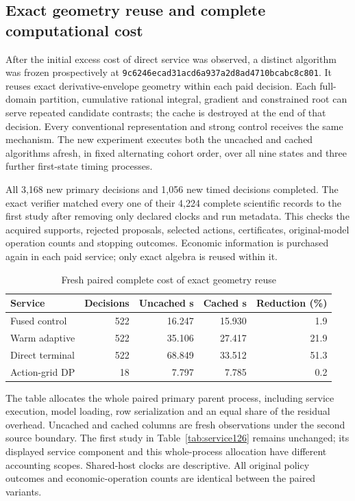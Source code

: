 \subsection{Exact geometry reuse and complete computational cost}\label{sec:cache_results126}
After the initial excess cost of direct service was observed, a distinct algorithm was frozen prospectively at
\nolinkurl{9c6246ecad31acd6a937a2d8ad4710bcabc8c801}. It reuses exact derivative-envelope geometry within each paid decision. Each full-domain partition, cumulative rational integral, gradient and constrained root can serve repeated candidate contrasts; the cache is destroyed at the end of that decision. Every conventional representation and strong control receives the same mechanism. The new experiment executes both the uncached and cached algorithms afresh, in fixed alternating cohort order, over all nine states and three further first-state timing processes.

All 3,168 new primary decisions and 1,056 new timed decisions completed. The exact verifier matched every one of their 4,224 complete scientific records to the first study after removing only declared clocks and run metadata. This checks the acquired supports, rejected proposals, selected actions, certificates, original-model operation counts and stopping outcomes. Economic information is purchased again in each paid service; only exact algebra is reused within it.

\begin{table}[t]\caption{Fresh paired complete cost of exact geometry reuse}\label{tab:cache126}\centering
\begin{tabular}{lrrrr}\toprule
Service & Decisions & Uncached s & Cached s & Reduction (\%)\\\midrule
Fused control & 522 & 16.247 & 15.930 & 1.9\\
Warm adaptive & 522 & 35.106 & 27.417 & 21.9\\
Direct terminal & 522 & 68.849 & 33.512 & 51.3\\
Action-grid DP & 18 & 7.797 & 7.785 & 0.2\\
\bottomrule\end{tabular}
\par\smallskip\footnotesize The table allocates the whole paired primary parent process, including service execution, model loading, row serialization and an equal share of the residual overhead. Uncached and cached columns are fresh observations under the second source boundary. The first study in Table~\ref{tab:service126} remains unchanged; its displayed service component and this whole-process allocation have different accounting scopes. Shared-host clocks are descriptive. All original policy outcomes and economic-operation counts are identical between the paired variants.
\end{table}

